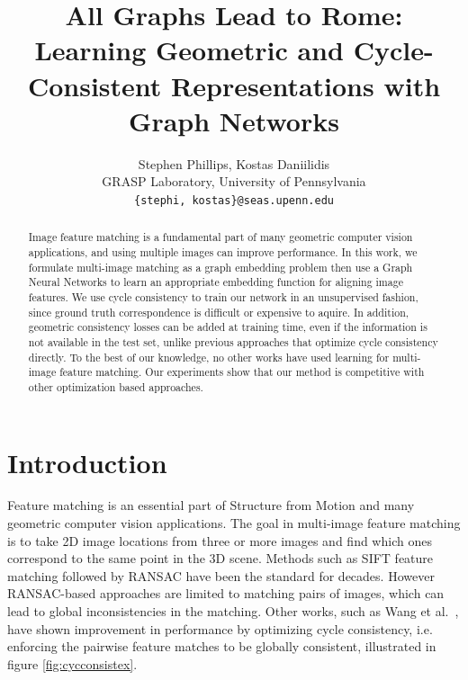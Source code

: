 \documentclass[10pt,twocolumn,letterpaper]{article}
\begin{document}
\title{All Graphs Lead to Rome: Learning Geometric and Cycle-Consistent Representations with Graph Networks}

\author{Stephen Phillips, Kostas Daniilidis \\
GRASP Laboratory, University of Pennsylvania\\
{\tt\small \{stephi, kostas\}@seas.upenn.edu}
}

\maketitle


\begin{abstract}
    Image feature matching is a fundamental part of many geometric computer vision applications, and using multiple images can improve performance.
    In this work, we formulate multi-image matching as a graph embedding problem then use a Graph Neural Networks to learn an appropriate embedding function for aligning image features.
    We use cycle consistency to train our network in an unsupervised fashion, since ground truth correspondence is difficult or expensive to aquire.
    In addition, geometric consistency losses can be added at training time, even if the information is not available in the test set, unlike previous approaches that optimize cycle consistency directly.
    To the best of our knowledge, no other works have used learning for multi-image feature matching.
    Our experiments show that our method is competitive with other optimization based approaches.
\end{abstract}

\section{Introduction}

Feature matching is an essential part of Structure from Motion and many geometric computer vision applications.
The goal in multi-image feature matching is to take 2D image locations from three or more images and find which ones correspond to the same point in the 3D scene.
Methods such as SIFT feature matching \cite{lowe2004distinctive} followed by RANSAC \cite{fischler1981random} have been the standard for decades.
However RANSAC-based approaches are limited to matching pairs of images, which can lead to global inconsistencies in the matching.
Other works, such as Wang et al.~\cite{wang2017multi}, have shown improvement in performance by optimizing cycle consistency, i.e. enforcing the pairwise feature matches to be globally consistent, illustrated in figure \ref{fig:cycconsistex}.
\end{document}
